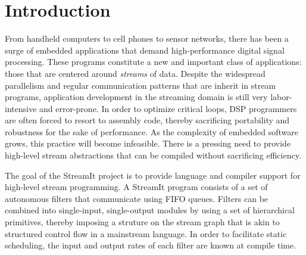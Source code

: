 \section{Introduction}

From handheld computers to cell phones to sensor networks, there has
been a surge of embedded applications that demand high-performance
digital signal processing.  These programs constitute a new and
important class of applications: those that are centered around {\it
streams} of data.  Despite the widespread parallelism and regular
communication patterns that are inherit in stream programs,
application development in the streaming domain is still very
labor-intensive and error-prone.  In order to optimize critical loops,
DSP programmers are often forced to resort to assembly code, thereby
sacrificing portability and robustness for the sake of performance.
As the complexity of embedded software grows, this practice will
become infeasible.  There is a pressing need to provide high-level
stream abstractions that can be compiled without sacrificing
efficiency.

The goal of the StreamIt project is to provide language and compiler
support for high-level stream programming.  A StreamIt program
consists of a set of autonomous filters that communicate using FIFO
queues.  Filters can be combined into single-input, single-output
modules by using a set of hierarchical primitives, thereby imposing a
struture on the stream graph that is akin to structured control flow
in a mainstream language.  In order to facilitate static scheduling,
the input and output rates of each filter are known at compile time.

